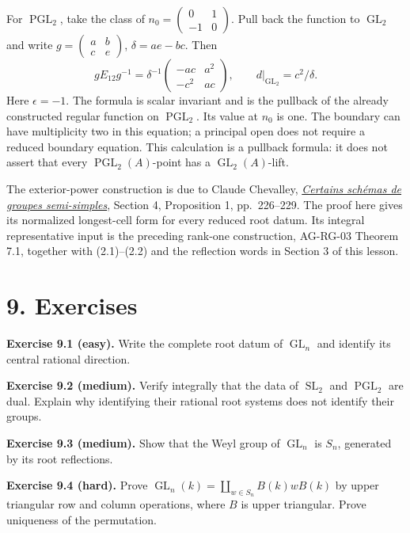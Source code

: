 \documentclass[11pt,a4paper,openany]{report}
\begin{document}
For \(\operatorname{PGL}_2\), take the class of \(n_0=\left(\begin{smallmatrix}0&1\\-1&0\end{smallmatrix}\right)\). Pull back the function to \(\operatorname{GL}_2\) and write \(g=\left(\begin{smallmatrix}a&b\\c&e\end{smallmatrix}\right)\), \(\delta=ae-bc\). Then \[
gE_{12}g^{-1}=\delta^{-1}
\begin{pmatrix}-ac&a^2\\-c^2&ac\end{pmatrix},
\qquad d\big|_{\operatorname{GL}_2}=c^2/\delta.
\] Here \(\epsilon=-1\). The formula is scalar invariant and is the pullback of the already constructed regular function on \(\operatorname{PGL}_2\). Its value at \(n_0\) is one. The boundary can have multiplicity two in this equation; a principal open does not require a reduced boundary equation. This calculation is a pullback formula: it does not assert that every \(\operatorname{PGL}_2(A)\)-point has a \(\operatorname{GL}_2(A)\)-lift.

The exterior-power construction is due to Claude Chevalley, \href{https://www.numdam.org/article/SB_1960-1961__6__219_0.pdf}{\emph{Certains schémas de groupes semi-simples}}, Section 4, Proposition 1, pp.~226--229. The proof here gives its normalized longest-cell form for every reduced root datum. Its integral representative input is the preceding rank-one construction, AG-RG-03 Theorem 7.1, together with (2.1)--(2.2) and the reflection words in Section 3 of this lesson.

\section{9. Exercises}\label{AG-RG-04-exercises}

\textbf{Exercise 9.1 (easy).} Write the complete root datum of \(\operatorname{GL}_n\) and identify its central rational direction.

\textbf{Exercise 9.2 (medium).} Verify integrally that the data of \(\operatorname{SL}_2\) and \(\operatorname{PGL}_2\) are dual. Explain why identifying their rational root systems does not identify their groups.

\textbf{Exercise 9.3 (medium).} Show that the Weyl group of \(\operatorname{GL}_n\) is \(S_n\), generated by its root reflections.

\textbf{Exercise 9.4 (hard).} Prove \(\operatorname{GL}_n(k)=\coprod_{w\in S_n}B(k)wB(k)\) by upper triangular row and column operations, where \(B\) is upper triangular. Prove uniqueness of the permutation.
\end{document}
